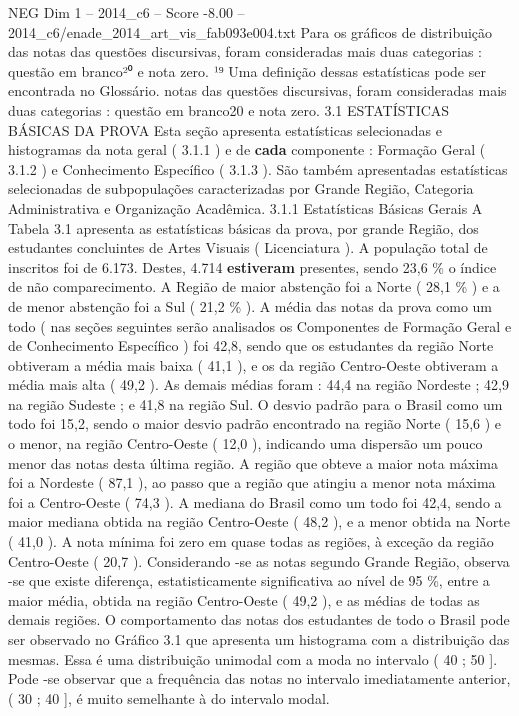 \begin{textsample}{NEG Dim 1 – 2014\_c6 – Score -8.00 – 2014\_c6/enade\_2014\_art\_vis\_fab093e004.txt}
Para os gráficos de distribuição das notas das questões discursivas, foram consideradas mais duas categorias : questão em branco²⁰ e nota zero. ¹⁹ Uma definição dessas estatísticas pode ser encontrada no Glossário. notas das questões discursivas, foram consideradas mais duas categorias : questão em branco20 e nota zero. 3.1 ESTATÍSTICAS BÁSICAS DA PROVA Esta seção apresenta estatísticas selecionadas e histogramas da nota geral ( 3.1.1 ) e de \textbf{cada} componente : Formação Geral ( 3.1.2 ) e Conhecimento Específico ( 3.1.3 ).
São também apresentadas estatísticas selecionadas de subpopulações caracterizadas por Grande Região, Categoria Administrativa e Organização Acadêmica. 3.1.1 Estatísticas Básicas Gerais A Tabela 3.1 apresenta as estatísticas básicas da prova, por grande Região, dos estudantes concluintes de Artes Visuais ( Licenciatura ).
A população total de inscritos foi de 6.173.
Destes, 4.714 \textbf{estiveram} presentes, sendo 23,6 \% o índice de não comparecimento.
A Região de maior abstenção foi a Norte ( 28,1 \% ) e a de menor abstenção foi a Sul ( 21,2 \% ).
A média das notas da prova como um todo ( nas seções seguintes serão analisados os Componentes de Formação Geral e de Conhecimento Específico ) foi 42,8, sendo que os estudantes da região Norte obtiveram a média mais baixa ( 41,1 ), e os da região Centro-Oeste obtiveram a média mais alta ( 49,2 ).
As demais médias foram : 44,4 na região Nordeste ; 42,9 na região Sudeste ; e 41,8 na região Sul.
O desvio padrão para o Brasil como um todo foi 15,2, sendo o maior desvio padrão encontrado na região Norte ( 15,6 ) e o menor, na região Centro-Oeste ( 12,0 ), indicando uma dispersão um pouco menor das notas desta última região.
A região que obteve a maior nota máxima foi a Nordeste ( 87,1 ), ao passo que a região que atingiu a menor nota máxima foi a Centro-Oeste ( 74,3 ).
A mediana do Brasil como um todo foi 42,4, sendo a maior mediana obtida na região Centro-Oeste ( 48,2 ), e a menor obtida na Norte ( 41,0 ).
A nota mínima foi zero em quase todas as regiões, à exceção da região Centro-Oeste ( 20,7 ).
Considerando -se as notas segundo Grande Região, observa -se que existe diferença, estatisticamente significativa ao nível de 95 \%, entre a maior média, obtida na região Centro-Oeste ( 49,2 ), e as médias de todas as demais regiões.
O comportamento das notas dos estudantes de todo o Brasil pode ser observado no Gráfico 3.1 que apresenta um histograma com a distribuição das mesmas.
Essa é uma distribuição unimodal com a moda no intervalo ( 40 ; 50 ].
Pode -se observar que a frequência das notas no intervalo imediatamente anterior, ( 30 ; 40 ], é muito semelhante à do intervalo modal.

\end{textsample}
